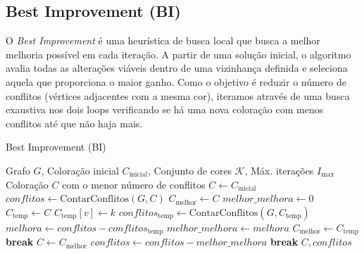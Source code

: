 \documentclass[12pt,a4paper]{article}
\begin{document}
\subsection{Best Improvement (BI)}
O \textit{Best Improvement} é uma heurística de busca local que busca a melhor melhoria possível em cada iteração. A partir de uma solução inicial, o algoritmo avalia todas as alterações viáveis dentro de uma vizinhança definida e seleciona aquela que proporciona o maior ganho. Como o objetivo é reduzir o número de conflitos (vértices adjacentes com a mesma cor), iteramos através de uma busca exaustiva nos dois loops verificando se há uma nova coloração com menos conflitos até que não haja mais.
\begin{algorithm}[H]
\caption{Best Improvement (BI)}
\label{alg:best_improvement}
\begin{algorithmic}[1]
\Require Grafo \(G\), Coloração inicial \(C_{\text{inicial}}\), Conjunto de cores \(\mathcal{K}\), Máx. iterações \(I_{\max}\)
\Ensure Coloração \(C\) com o menor número de conflitos
\State \(C \gets C_{\text{inicial}}\)
\State \(conflitos \gets \text{ContarConflitos}(G, C)\)
    \State \(C_{\text{melhor}} \gets C\)
    \State \(melhor\_melhora \gets 0\)
            \State \(C_{\text{temp}} \gets C\)
            \State \(C_{\text{temp}}[v] \gets k\)
            \State \(conflitos_{\text{temp}} \gets \text{ContarConflitos}(G, C_{\text{temp}})\)
            \State \(melhora \gets conflitos - conflitos_{\text{temp}}\)
                \State \(melhor\_melhora \gets melhora\)
                \State \(C_{\text{melhor}} \gets C_{\text{temp}}\)
            \EndIf
        \EndFor
    \EndFor
     \State \textbf{break}  \EndIf
    \State \(C \gets C_{\text{melhor}}\)
    \State \(conflitos \gets conflitos - melhor\_melhora\)
     \State \textbf{break} \EndIf
\EndFor
\State \Return \(C, conflitos\)
\end{algorithmic}
\end{algorithm}
\end{document}
